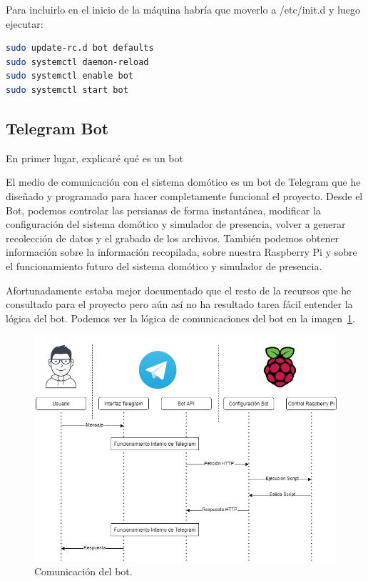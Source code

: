 Para incluirlo en el inicio de la máquina habría que moverlo a /etc/init.d y luego ejecutar: 
\begin{lstlisting}[language=sh, firstnumber=0]    
sudo update-rc.d bot defaults
sudo systemctl daemon-reload
sudo systemctl enable bot
sudo systemctl start bot
\end{lstlisting}  


\subsection{Telegram Bot}\label{5.TelegramBot}
En primer lugar, explicaré qué es un bot

El medio de comunicación con el sistema domótico es un bot de Telegram que he diseñado y programado para hacer completamente funcional el proyecto. Desde el Bot, podemos controlar las persianas de forma instantánea, modificar la configuración del sistema domótico y simulador de presencia, volver a generar recolección de datos y el grabado de los archivos. También podemos obtener información sobre la información recopilada, sobre nuestra Raspberry Pi y sobre el funcionamiento futuro del sistema domótico y simulador de presencia.

Afortunadamente estaba mejor documentado que el resto de la recursos que he consultado para el proyecto pero aún así no ha resultado tarea fácil entender la lógica del bot. 
Podemos ver la lógica de comunicaciones del bot en la imagen~\ref{Img:FuncionamientoBot}. 

\begin{figure}[h]
    \centering
    \includegraphics[width=1.0\textwidth]{img/Diagramas/FuncionamientoBot.png}
    \caption{Comunicación del bot. } \label{Img:FuncionamientoBot}
\end{figure}

